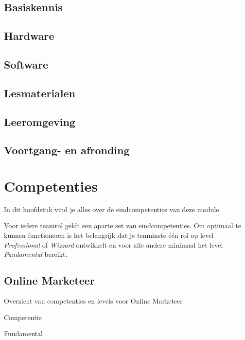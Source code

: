 \documentclass[]{book}
\begin{document}
\section{Basiskennis}\label{basiskennis}

\section{Hardware}\label{hardware}

\section{Software}\label{software}

\section{Lesmaterialen}\label{lesmaterialen}

\section{Leeromgeving}\label{leeromgeving}

\section{Voortgang- en afronding}\label{voortgang--en-afronding}

\chapter{Competenties}\label{competenties}

In dit hoofdstuk vind je alles over de eindcompetenties van deze module.

Voor iedere teamrol geldt een aparte set van eindcompetenties. Om
optimaal te kunnen functioneren is het belangrijk dat je tenminste één
rol op level \emph{Professional} of \emph{Wizzard} ontwikkelt en voor
alle andere minimaal het level \emph{Fundamental} bereikt.

\section{Online Marketeer}\label{online-marketeer}

\label{tab:unnamed-chunk-3}Overzicht van competenties en levels voor Online
Marketeer

Competentie

Fundamental
\end{document}
